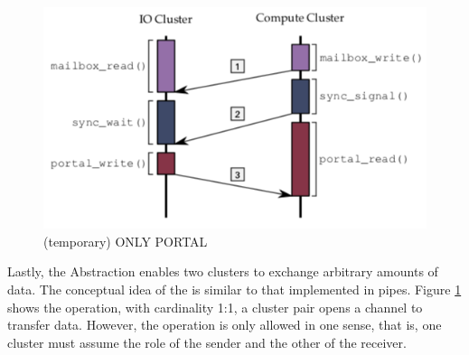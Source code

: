 			\begin{figure}[h]
				\centering
				\includegraphics[width=.7\textwidth]{images/conceptual-sync.png}

				\caption{
					(temporary) ONLY PORTAL
				}\par
				\label{fig::conpt_portal}
			\end{figure}

			Lastly, the \portal Abstraction enables two clusters to exchange arbitrary
			amounts of data.
			The conceptual idea of ​​the \portal is similar to that implemented in \posix pipes.
			Figure \ref{fig::conpt_portal} shows the \portal operation, with cardinality
			1:1, a cluster pair opens a channel to transfer data.
			However, the operation is only allowed in one sense, that is, one
			cluster must assume the role of the sender and the other of the receiver.
